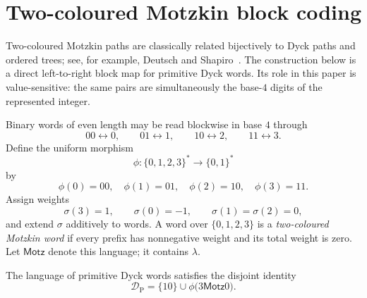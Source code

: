 \documentclass{ws-ijfcs}
\newcommand{\DP}{\mathcal{D}_{\mathrm{P}}}
\begin{document}
\section{Two-coloured Motzkin block coding}\label{sec:base4}

Two-coloured Motzkin paths are classically related bijectively to Dyck
paths and ordered trees; see, for example, Deutsch and
Shapiro~\cite{DeutschShapiro}.  The construction below is a direct
left-to-right block map for primitive Dyck words.  Its role in this paper
is value-sensitive: the same pairs are simultaneously the base-$4$ digits
of the represented integer.

Binary words of even length may be read blockwise in base $4$ through
\[
 00\leftrightarrow0,\qquad
 01\leftrightarrow1,\qquad
 10\leftrightarrow2,\qquad
 11\leftrightarrow3.
\]
Define the uniform morphism
\[
 \phi:\{0,1,2,3\}^*\longrightarrow\{0,1\}^*
\]
by
\[
 \phi(0)=00,\quad \phi(1)=01,\quad
 \phi(2)=10,\quad \phi(3)=11.
\]
Assign weights
\[
 \sigma(3)=1,\qquad \sigma(0)=-1,\qquad
 \sigma(1)=\sigma(2)=0,
\]
and extend $\sigma$ additively to words.  A word over
$\{0,1,2,3\}$ is a \emph{two-coloured Motzkin word} if every prefix has
nonnegative weight and its total weight is zero.  Let $\mathsf{Motz}$
denote this language; it contains $\lambda$.

\begin{theorem}\label{thm:block-coding}
The language of primitive Dyck words satisfies the disjoint identity
\begin{equation}\label{eq:block-coding-language}
 \DP=\{10\}\cup\phi\bigl(3\mathsf{Motz}0\bigr).
\end{equation}
\end{theorem}
\end{document}
